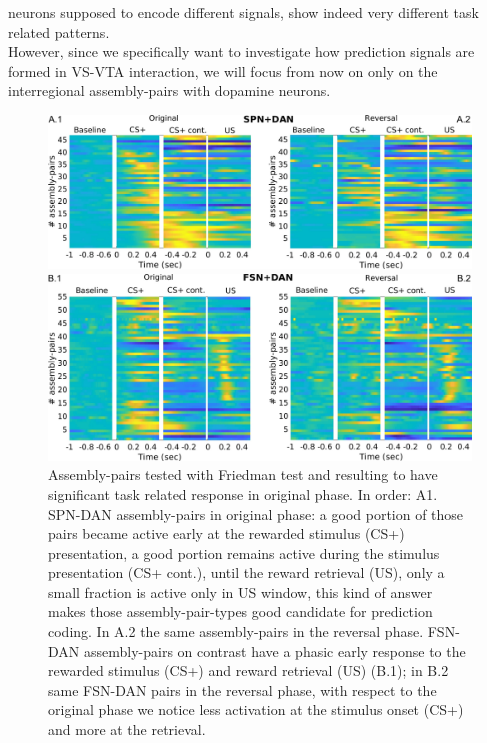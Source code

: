 neurons supposed to encode different signals, show indeed very different task related patterns.\\However, since we specifically want to investigate how prediction signals are formed in VS-VTA interaction, we will focus from now on only on the interregional assembly-pairs with dopamine neurons.\\
 \begin{figure}
     \centering
     \includegraphics[scale=0.32]{figures/HeatSPN_DAN.pdf}
     
     \vspace{1cm}
     
     \includegraphics[scale=0.32]{figures/HeatFSN_DAN.pdf}
     \caption{Assembly-pairs tested with Friedman test and resulting to have significant task related response in original phase. In order: A1. SPN-DAN assembly-pairs in original phase: a good portion of those pairs became active early at the rewarded stimulus (CS+) presentation, a good portion remains active during the stimulus presentation (CS+ cont.), until the reward retrieval (US), only a small fraction is active only in US window, this kind of answer makes those assembly-pair-types good candidate for prediction coding. In A.2 the same assembly-pairs in the reversal phase. FSN-DAN assembly-pairs on contrast have a phasic early response to the rewarded stimulus (CS+) and reward retrieval (US) (B.1); in B.2 same FSN-DAN pairs in the reversal phase, with respect to the original phase we notice less activation at the stimulus onset (CS+) and more at the retrieval.}
     \label{fig:HeatPairsDan}
 \end{figure}
